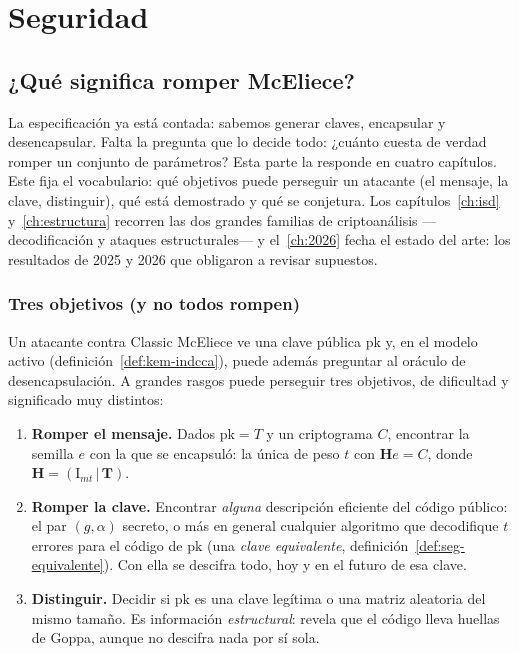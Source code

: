 \documentclass[11pt,a4paper,oneside]{report}
\newcommand{\Hmat}{\mathbf{H}}          %
\newcommand{\Tmat}{\mathbf{T}}          %
\begin{document}
\clearpage

\part{Seguridad}\label{part:seguridad}

\chapter{¿Qué significa romper McEliece?}\label{ch:seguridad}

\begin{roadmap}
La especificación ya está contada: sabemos generar claves, encapsular
y desencapsular. Falta la pregunta que lo decide todo: ¿cuánto cuesta
de verdad romper un conjunto de parámetros? Esta parte la responde en
cuatro capítulos. Este fija el vocabulario: qué objetivos puede
perseguir un atacante (el mensaje, la clave, distinguir), qué está
demostrado y qué se conjetura. Los capítulos~\ref{ch:isd}
y~\ref{ch:estructura} recorren las dos grandes familias de
criptoanálisis ---decodificación y ataques estructurales--- y
el~\ref{ch:2026} fecha el estado del arte: los resultados de 2025 y
2026 que obligaron a revisar supuestos.
\end{roadmap}

\section{Tres objetivos (y no todos rompen)}

Un atacante contra Classic McEliece ve una clave pública
$\mathrm{pk}$ y, en el modelo activo
(definición~\ref{def:kem-indcca}), puede además preguntar al oráculo de
desencapsulación. A grandes rasgos puede perseguir tres objetivos, de
dificultad y significado muy distintos:

\begin{enumerate}[leftmargin=1.7em,itemsep=3pt]
  \item \textbf{Romper el mensaje.} Dados $\mathrm{pk}=T$ y un
        criptograma $C$, encontrar la semilla $e$ con la que se
        encapsuló: la única de peso $t$ con $\Hmat e=C$, donde
        $\Hmat=(\mathrm{I}_{mt}\,|\,\Tmat)$.
  \item \textbf{Romper la clave.} Encontrar \emph{alguna} descripción
        eficiente del código público: el par $(g,\alpha)$ secreto, o
        más en general cualquier algoritmo que decodifique $t$
        errores para el código de $\mathrm{pk}$ (una \emph{clave
        equivalente}, definición~\ref{def:seg-equivalente}). Con ella
        se descifra todo, hoy y en el futuro de esa clave.
  \item \textbf{Distinguir.} Decidir si $\mathrm{pk}$ es una clave
        legítima o una matriz aleatoria del mismo tamaño. Es
        información \emph{estructural}: revela que el código lleva
        huellas de Goppa, aunque no descifra nada por sí sola.
\end{enumerate}
\end{document}
